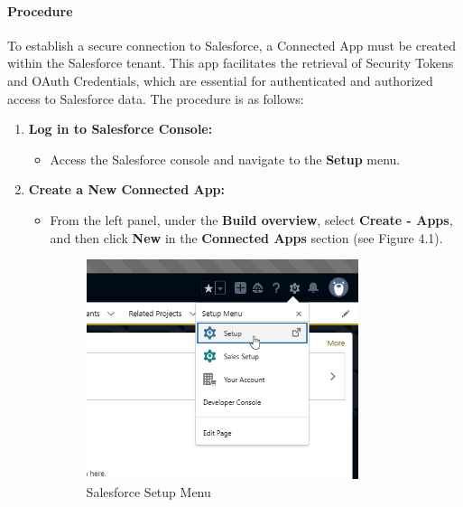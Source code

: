 \paragraph{Procedure}
To establish a secure connection to Salesforce, a Connected App must be created within the Salesforce tenant. This app facilitates the retrieval of Security Tokens and OAuth Credentials, which are essential for authenticated and authorized access to Salesforce data. The procedure is as follows:

\begin{enumerate}
    \item \textbf{Log in to Salesforce Console:}
    \begin{itemize}
        \item Access the Salesforce console and navigate to the \textbf{Setup} menu.
    \end{itemize}

    \item \textbf{Create a New Connected App:}
    \begin{itemize}
        \item From the left panel, under the \textbf{Build overview}, select \textbf{Create - Apps}, and then click \textbf{New} in the \textbf{Connected Apps} section (see Figure 4.1).
        \begin{figure}[h!]
            \centering
            \includegraphics[width=0.8\textwidth]{Chapter4/Pictures/Setup.png} %
            \caption{Salesforce Setup Menu}
            \label{fig:create_app1}
        \end{figure}


\end{itemize}
\end{enumerate}
